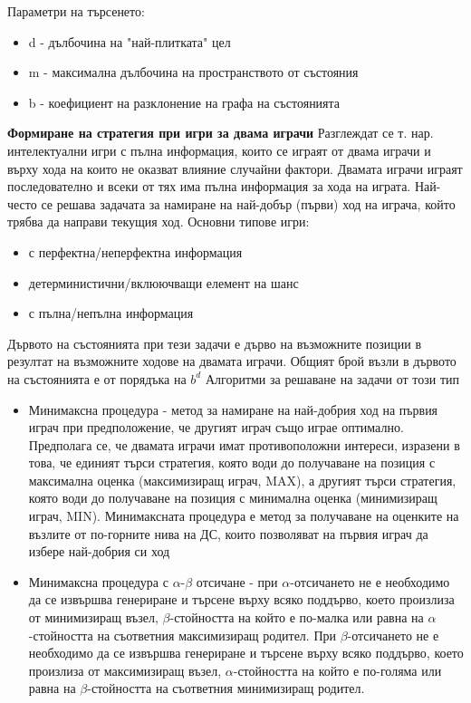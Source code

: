 \documentclass{article}
\begin{document}
Параметри на търсенето:
\begin{itemize}
    \item d - дълбочина на "най-плитката" цел
    \item m - максимална дълбочина на пространството от състояния
    \item b - коефициент на разклонение на графа на състоянията
\end{itemize}

\textbf{Формиране на стратегия при игри за двама играчи} \newline\newline
Разглеждат се т. нар. интелектуални игри с пълна информация, които се играят от двама играчи и върху хода
на които не оказват влияние случайни фактори. Двамата играчи играят последователно и всеки от тях има пълна
информация за хода на играта. Най-често се решава задачата за намиране на най-добър (първи) ход на играча,
който трябва да направи текущия ход. \newline\newline
Основни типове игри:
\begin{itemize}
    \item с перфектна/неперфектна информация
    \item детерминистични/вклюючващи елемент на шанс
    \item с пълна/непълна информация
\end{itemize}
Дървото на състоянията при тези задачи е дърво на възможните позиции в резултат на възможните ходове на двамата
играчи. Общият брой възли в дървото на състоянията е от порядъка на $b^d$ \newline\newline
Алгоритми за решаване на задачи от този тип
\begin{itemize}
    \item Минимаксна процедура - метод за намиране на най-добрия ход на първия играч при предположение, че другият играч също
    играе оптимално. Предполага се, че двамата играчи имат противоположни интереси, изразени в това, че единият търси стратегия,
    която води до получаване на позиция с максимална оценка (максимизиращ играч, MAX), а другият търси стратегия, която води до
    получаване на позиция с минимална оценка (минимизиращ играч, MIN). Минимаксната процедура е метод за получаване на оценките
    на възлите от по-горните нива на ДС, които позволяват на първия играч да избере най-добрия си ход
    \item Минимаксна процедура с $\alpha$-$\beta$ отсичане - при $\alpha$-отсичането не е необходимо да се извършва генериране и търсене
    върху всяко поддърво, което произлиза от минимизиращ възел, $\beta$-стойността на който е по-малка или равна на $\alpha$-стойността
    на съответния максимизиращ родител. При $\beta$-отсичането не е необходимо да се извършва генериране и търсене върху всяко
    поддърво, което произлиза от максимизиращ възел, $\alpha$-стойността на който е по-голяма или равна на $\beta$-стойността на съответния минимизиращ родител.
\end{itemize}
\end{document}
